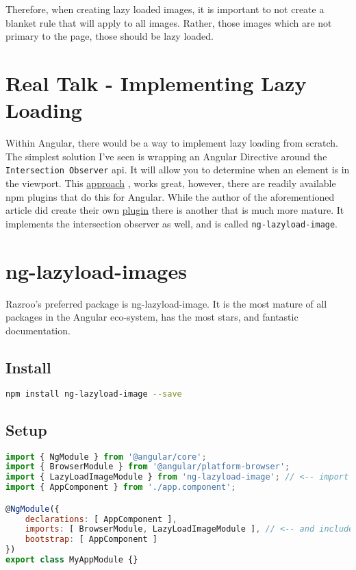 Therefore, when creating lazy loaded images, it is important to not create a 
blanket rule that will apply to all images. Rather, those images which are not 
primary to the page, those should be lazy loaded. 

\section{ Real Talk - Implementing Lazy Loading }
Within Angular, there would be a way to implement lazy loading from scratch. 
The simplest solution I've seen is wrapping an Angular Directive around the 
\lstinline{Intersection Observer} api. It will allow you to determine when 
an element is in the viewport. 
This \href{https://blog.angularindepth.com/a-modern-solution-to-lazy-loading-using-intersection-observer-9280c149bbc}{approach}
, works great, however, there are readily available npm plugins that do this for Angular. 
While the author of the aforementioned article did create their own \href{https://github.com/TradeMe/ng-defer-load}{plugin}
there is another that is much more mature. It implements the intersection 
observer as well, and is called \lstinline{ng-lazyload-image}.

\section{ng-lazyload-images}
Razroo's preferred package is ng-lazyload-image. It is the most mature of 
all packages in the Angular eco-system, has the most stars, and fantastic 
documentation. 

\subsection{Install}
\begin{lstlisting}[language=bash]
npm install ng-lazyload-image --save
\end{lstlisting}

\subsection{Setup}
\begin{lstlisting}[language=javascript]
import { NgModule } from '@angular/core';
import { BrowserModule } from '@angular/platform-browser';
import { LazyLoadImageModule } from 'ng-lazyload-image'; // <-- import it
import { AppComponent } from './app.component';

@NgModule({
    declarations: [ AppComponent ],
    imports: [ BrowserModule, LazyLoadImageModule ], // <-- and include it
    bootstrap: [ AppComponent ]
})
export class MyAppModule {}
\end{lstlisting}